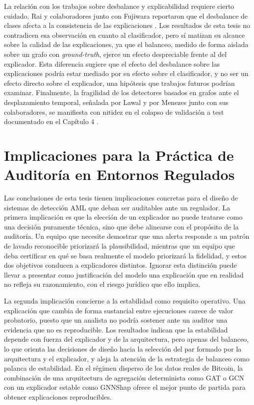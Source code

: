 La relación con los trabajos sobre desbalance y explicabilidad requiere cierto cuidado. Rai y colaboradores junto con Fujiwara reportaron que el desbalance de clases afecta a la consistencia de las explicaciones \cite{Rai2025EvaluatingData, Fujiwara2024KnowledgeStability}. Los resultados de esta tesis no contradicen esa observación en cuanto al clasificador, pero sí matizan su alcance sobre la calidad de las explicaciones, ya que el balanceo, medido de forma aislada sobre un grafo con \textit{ground-truth}, ejerce un efecto despreciable frente al del explicador. Esta diferencia sugiere que el efecto del desbalance sobre las explicaciones podría estar mediado por su efecto sobre el clasificador, y no ser un efecto directo sobre el explicador, una hipótesis que trabajos futuros podrían examinar. Finalmente, la fragilidad de los detectores basados en grafos ante el desplazamiento temporal, señalada por Lawal y por Menezes junto con sus colaboradores, se manifiesta con nitidez en el colapso de validación a test documentado en el Capítulo 4 \cite{Lawal2025AnDataset, Menezes2025SemanticDetectors}.

\section{Implicaciones para la Práctica de Auditoría en Entornos Regulados}

Las conclusiones de esta tesis tienen implicaciones concretas para el diseño de sistemas de detección AML que deban ser auditables ante un regulador. La primera implicación es que la elección de un explicador no puede tratarse como una decisión puramente técnica, sino que debe alinearse con el propósito de la auditoría. Un equipo que necesite demostrar que una alerta responde a un patrón de lavado reconocible priorizará la plausibilidad, mientras que un equipo que deba certificar en qué se basa realmente el modelo priorizará la fidelidad, y estos dos objetivos conducen a explicadores distintos. Ignorar esta distinción puede llevar a presentar como justificación del modelo una explicación que en realidad no refleja su razonamiento, con el riesgo jurídico que ello implica.

La segunda implicación concierne a la estabilidad como requisito operativo. Una explicación que cambia de forma sustancial entre ejecuciones carece de valor probatorio, puesto que un analista no podría sostener ante un auditor una evidencia que no es reproducible. Los resultados indican que la estabilidad depende con fuerza del explicador y de la arquitectura, pero apenas del balanceo, lo que orienta las decisiones de diseño hacia la selección del par formado por la arquitectura y el explicador, y aleja la atención de la estrategia de balanceo como palanca de estabilidad. En el régimen disperso de los datos reales de Bitcoin, la combinación de una arquitectura de agregación determinista como GAT o GCN con un explicador estable como GNNShap ofrece el mejor punto de partida para obtener explicaciones reproducibles.

